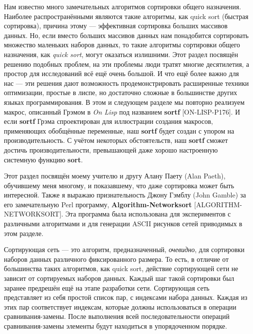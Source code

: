 Нам известно много замечательных алгоритмов сортировки общего назначения. Наиболее распространёнными являются такие алгоритмы, как quick sort (быстрая сортировка), причина этому --- эффективная сортировка больших массивов данных. Но, если вместо больших массивов данных нам понадобится сортировать множество маленьких наборов данных, то такие алгоритмы сортировки общего назначения, как \emph{quick sort}, могут оказаться излишними. Этот раздел посвящён решению подобных проблем, на эти проблемы люди тратят многие десятилетия, а простор для исследований всё ещё очень большой. И что ещё более важно для нас --- эти решения дают возможность продемонстрировать расширенные техники оптимизации, простые в лиспе, но достаточно сложные в большинстве других языках программирования. В этом и следующем разделе мы повторно реализуем макрос, описанный Грэмом в \emph{On Lisp} под названием \textbf{sortf} [ON-LISP-P176]. И если \textbf{sortf} Грэма спроектирован для иллюстрации создания макросов, применяющих обобщённые переменные, наш \textbf{sortf} будет создан с упором на производительность. С учётом некоторых обстоятельств, наш \textbf{sortf} сможет достичь производительности, превышающей даже хорошо настроенную системную функцию \textbf{sort}.

Этот раздел посвящён моему учителю и другу Алану Паету (Alan Paeth), обучившему меня многому, и показавшему, что даже сортировка может быть интересной. Также я выражаю признательность Джону Гэмблу (John Gamble) за его замечательную Perl программу, \textbf{Algorithm-Networksort} [ALGORITHM-NETWORKSORT]. Эта программа была использована для экспериментов с различными алгоритмами и для генерации ASCII рисунков сетей приводимых в этом разделе.

Сортирующая сеть --- это алгоритм, предназначенный, \emph{очевидно}, для сортировки наборов данных различного фиксированного размера. То есть, в отличие от большинства таких алгоритмов, как quick sort, действие сортирующей сети не зависит от сортируемых наборов данных. Каждый шаг такой сортировки был заранее предрешён ещё на этапе разработки сети. Сортирующая сеть представляет из себя простой список пар, с индексами набора данных. Каждая из этих пар соответствует индексам, которые должны использоваться в операции срав\-ни\-ва\-ния-за\-ме\-ны. После выполнения всей последовательности операций срав\-ни\-ва\-ния-за\-ме\-ны элементы будут находиться в упорядоченном порядке.

